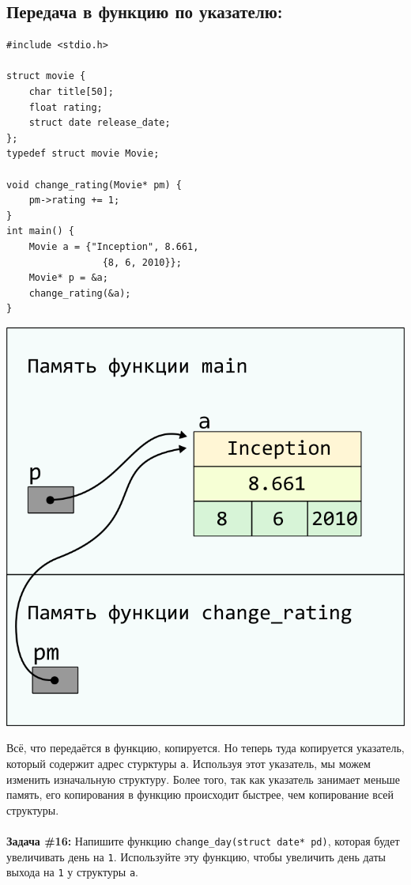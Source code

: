 \documentclass{article}
\begin{document}
\subsection*{Передача в функцию по указателю:}
\begin{multicols}{2}
\begin{lstlisting}
#include <stdio.h>

struct movie {
	char title[50];
	float rating;
	struct date release_date;
};
typedef struct movie Movie;

void change_rating(Movie* pm) {
	pm->rating += 1;
}
int main() {
	Movie a = {"Inception", 8.661, 
	             {8, 6, 2010}};
	Movie* p = &a;
	change_rating(&a);
}
\end{lstlisting}
\columnbreak
\begin{center}
\includegraphics[scale=1]{../images/pointer_schemes/function_by_pointer.png}
\end{center}
\end{multicols}
Всё, что передаётся в функцию, копируется. Но теперь туда копируется указатель, который содержит
адрес стурктуры \texttt{a}. Используя этот указатель, мы можем изменить изначальную структуру. Более того, так как указатель занимает меньше память, его копирования в функцию происходит быстрее, чем копирование всей структуры.\\\\
\textbf{Задача \#16:} Напишите функцию \texttt{change\_day(struct date* pd)}, которая будет увеличивать день на \texttt{1}. Используйте эту функцию, чтобы увеличить день даты выхода на \texttt{1} у структуры \texttt{a}.\\
\end{document}
